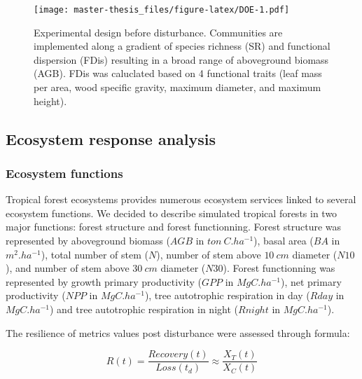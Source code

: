 \documentclass[12pt,]{article}
\theoremstyle{definition}
\theoremstyle{definition}
\theoremstyle{remark}
\begin{document}
\begin{figure}[htbp]
\centering
\texttt{[image: master-thesis\_files/figure-latex/DOE-1.pdf]}
\caption{\label{fig:DOE}Experimental design before disturbance. Communities
are implemented along a gradient of species richness (SR) and functional
dispersion (FDis) resulting in a broad range of aboveground biomass
(AGB). FDis was caluclated based on 4 functional traits (leaf mass per
area, wood specific gravity, maximum diameter, and maximum height).}
\end{figure}

\subsection{Ecosystem response
analysis}\label{ecosystem-response-analysis}

\subsubsection{Ecosystem functions}\label{ecosystem-functions}

Tropical forest ecosystems provides numerous ecosystem services linked
to several ecosystem functions. We decided to describe simulated
tropical forests in two major functions: forest structure and forest
functionning. Forest structure was represented by aboveground biomass
(\(AGB\) in \(ton~C.ha^{-1}\)), basal area (\(BA\) in \(m^2.ha^{-1}\)),
total number of stem (\(N\)), number of stem above \(10~cm\) diameter
(\(N10\)), and number of stem above \(30~cm\) diameter (\(N30\)). Forest
functionning was represented by growth primary productivity (\(GPP\) in
\(MgC.ha^{-1}\)), net primary productivity (\(NPP\) in \(MgC.ha^{-1}\)),
tree autotrophic respiration in day (\(Rday\) in \(MgC.ha^{-1}\)) and
tree autotrophic respiration in night (\(Rnight\) in \(MgC.ha^{-1}\)).

The resilience of metrics values post disturbance were assessed through
\citet{Henry2012} formula:

\begin{equation}
  R\left(t\right)=\frac{Recovery\left(t\right)}{Loss\left(t_d\right)} \approx \frac{X_T(t)}{X_C(t)}
  \label{eq:Resilience}
\end{equation}
\end{document}
